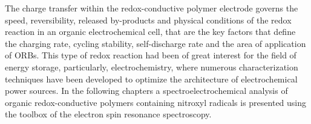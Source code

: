 The charge transfer within the redox-conductive polymer electrode governs the speed, reversibility, released by-products and physical conditions of the redox reaction in an organic electrochemical cell, that are the key factors that define the charging rate, cycling stability, self-discharge rate and the area of application of ORBs. This type of redox reaction had been of great interest for the field of energy storage, particularly, electrochemistry, where numerous characterization techniques have been developed to optimize the architecture of electrochemical power sources. In the following chapters a spectroelectrochemical analysis of organic redox-conductive polymers containing nitroxyl radicals is presented using the toolbox of the electron spin resonance spectroscopy.\\